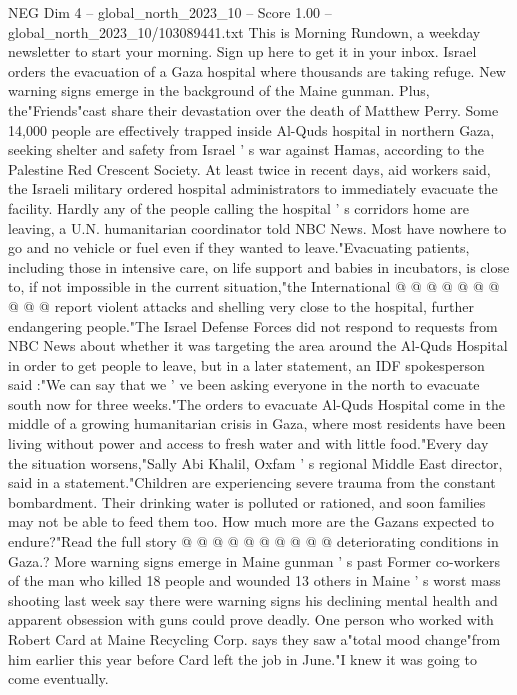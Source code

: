 \begin{textsample}{NEG Dim 4 – global\_north\_2023\_10 – Score 1.00 – global\_north\_2023\_10/103089441.txt}  \label{ex:f4_neg_011}
This is Morning Rundown, a weekday newsletter to start your morning.
Sign up here to get it in your inbox.
Israel orders the evacuation of a Gaza hospital where thousands are taking refuge.
New warning signs emerge in the background of the Maine gunman.
Plus, the"Friends"cast share their devastation over the death of Matthew Perry.
Some 14,000 people are effectively trapped inside Al-Quds hospital in northern Gaza, seeking shelter and safety from Israel ' s war against Hamas, according to the Palestine Red Crescent Society.
At least twice in recent days, aid workers said, the Israeli military ordered hospital administrators to immediately evacuate the facility.
Hardly any of the people calling the hospital ' s corridors home are leaving, a U.N. humanitarian coordinator told NBC News.
Most have nowhere to go and no vehicle or fuel even if they wanted to leave."Evacuating patients, including those in intensive care, on life support and babies in incubators, is close to, if not impossible in the current situation,"the International @ @ @ @ @ @ @ @ @ @ report violent attacks and shelling very close to the hospital, further endangering people."The Israel Defense Forces did not respond to requests from NBC News about whether it was targeting the area around the Al-Quds Hospital in order to get people to leave, but in a later statement, an IDF spokesperson said :"We can say that we ' ve been asking everyone in the north to evacuate south now for three weeks."The orders to evacuate Al-Quds Hospital come in the middle of a growing humanitarian crisis in Gaza, where most residents have been living without power and access to fresh water and with little food."Every day the situation worsens,"Sally Abi Khalil, Oxfam ' s regional Middle East director, said in a statement."Children are experiencing severe trauma from the constant bombardment.
Their drinking water is polluted or rationed, and soon families may not be able to feed them too.
How much more are the Gazans expected to endure?"Read the full story @ @ @ @ @ @ @ @ @ @ deteriorating conditions in Gaza.?
More warning signs emerge in Maine gunman ' s past Former co-workers of the man who killed 18 people and wounded 13 others in Maine ' s worst mass shooting last week say there were warning signs his declining mental health and apparent obsession with guns could prove deadly.
One person who worked with Robert Card at Maine Recycling Corp. says they saw a"total mood change"from him earlier this year before Card left the job in June."I knew it was going to come eventually.

\end{textsample}
